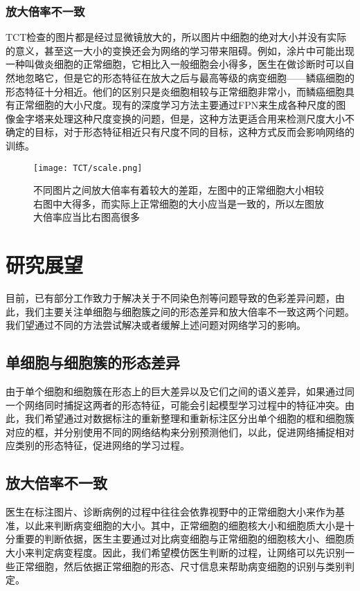 \subsubsection{放大倍率不一致}
\par TCT检查的图片都是经过显微镜放大的，所以图片中细胞的绝对大小并没有实际的意义，甚至这一大小的变换还会为网络的学习带来阻碍。例如，涂片中可能出现一种叫做炎细胞的正常细胞，它相比入一般细胞会小得多，医生在做诊断时可以自然地忽略它，但是它的形态特征在放大之后与最高等级的病变细胞——鳞癌细胞的形态特征十分相近。他们的区别只是炎细胞相较与正常细胞非常小，而鳞癌细胞具有正常细胞的大小尺度。现有的深度学习方法主要通过FPN来生成各种尺度的图像金字塔来处理这种尺度变换的问题，但是，这种方法更适合用来检测尺度大小不确定的目标，对于形态特征相近只有尺度不同的目标，这种方式反而会影响网络的训练。
\begin{figure}[h]
    \centering
    \texttt{[image: TCT/scale.png]}
    \caption{不同图片之间放大倍率有着较大的差距，左图中的正常细胞大小相较右图中大得多，而实际上正常细胞的大小应当是一致的，所以左图放大倍率应当比右图高很多}
    \label{倍率差异}
\end{figure}
\section{研究展望}
\par 目前，已有部分工作致力于解决关于不同染色剂等问题导致的色彩差异问题，由此，我们主要关注单细胞与细胞簇之间的形态差异和放大倍率不一致这两个问题。我们望通过不同的方法尝试解决或者缓解上述问题对网络学习的影响。

\subsection{单细胞与细胞簇的形态差异}
\par 由于单个细胞和细胞簇在形态上的巨大差异以及它们之间的语义差异，如果通过同一个网络同时捕捉这两者的形态特征，可能会引起模型学习过程中的特征冲突。由此，我们希望通过对数据标注的重新整理和重新标注区分出单个细胞的框和细胞簇对应的框，并分别使用不同的网络结构来分别预测他们，以此，促进网络捕捉相对应类别的形态特征，促进网络的学习过程。

\subsection{放大倍率不一致}
\par 医生在标注图片、诊断病例的过程中往往会依靠视野中的正常细胞大小来作为基准，以此来判断病变细胞的大小。其中，正常细胞的细胞核大小和细胞质大小是十分重要的判断依据，医生主要通过对比病变细胞与正常细胞的细胞核大小、细胞质大小来判定病变程度。因此，我们希望模仿医生判断的过程，让网络可以先识别一些正常细胞，然后依据正常细胞的形态、尺寸信息来帮助病变细胞的识别与类别判定。

\newpage
\begingroup
{}
\printbibliography[title={参考文献}]
\endgroup
